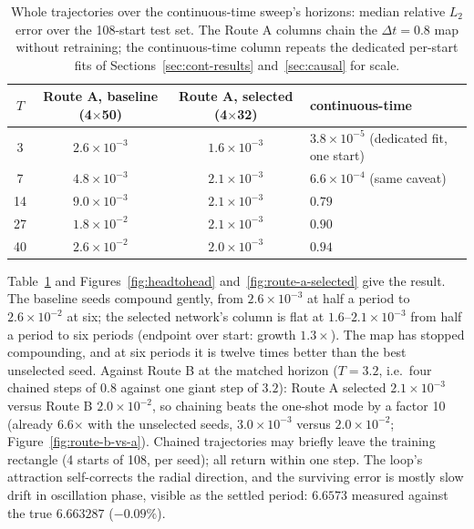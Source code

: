 \documentclass[11pt,a4paper]{article}
\begin{document}
\begin{table}[tbp]
  \centering
  \caption{Whole trajectories over the continuous-time sweep's horizons:
  median relative $L_2$ error over the 108-start test set. The Route A
  columns chain the $\Delta t = 0.8$ map without retraining; the
  continuous-time column repeats the dedicated per-start fits of
  Sections~\ref{sec:cont-results} and~\ref{sec:causal} for scale.}
  \label{tab:routes}
  \small
  \begin{tabular}{cccl}
    \toprule
    $T$ & Route A, baseline (4$\times$50) & Route A, selected (4$\times$32) & continuous-time \\
    \midrule
    3  & $2.6\times10^{-3}$ & $1.6\times10^{-3}$ & $3.8\times10^{-5}$ (dedicated fit, one start) \\
    7  & $4.8\times10^{-3}$ & $2.1\times10^{-3}$ & $6.6\times10^{-4}$ (same caveat) \\
    14 & $9.0\times10^{-3}$ & $2.1\times10^{-3}$ & $0.79$ \\
    27 & $1.8\times10^{-2}$ & $2.1\times10^{-3}$ & $0.90$ \\
    40 & $2.6\times10^{-2}$ & $2.0\times10^{-3}$ & $0.94$ \\
    \bottomrule
  \end{tabular}
\end{table}

Table~\ref{tab:routes} and Figures~\ref{fig:headtohead}
and~\ref{fig:route-a-selected} give the result. The baseline seeds
compound gently, from $2.6\times10^{-3}$ at half a period to
$2.6\times10^{-2}$ at six; the selected network's column is flat at
$1.6$--$2.1\times10^{-3}$ from half a period to six periods (endpoint over
start: growth $1.3\times$). The map has stopped compounding, and at six
periods it is twelve times better than the best unselected seed. Against
Route B at the matched horizon ($T = 3.2$, i.e.\ four chained steps of
$0.8$ against one giant step of $3.2$): Route A selected
$2.1\times10^{-3}$ versus Route B $2.0\times10^{-2}$, so chaining beats
the one-shot mode by a factor 10 (already 6.6$\times$ with the unselected
seeds, $3.0\times10^{-3}$ versus $2.0\times10^{-2}$;
Figure~\ref{fig:route-b-vs-a}). Chained trajectories may briefly leave the
training rectangle (4 starts of 108, per seed); all return within one
step. The loop's attraction self-corrects the radial direction, and the
surviving error is mostly slow drift in oscillation phase, visible as the
settled period: $6.6573$ measured against the true $6.663287$
($-0.09\%$).
\end{document}

